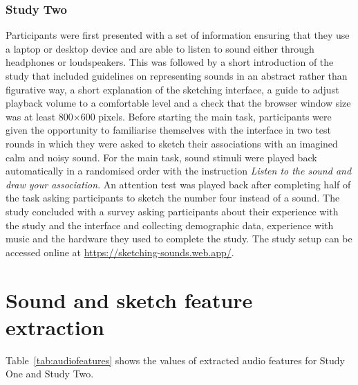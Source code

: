 \documentclass[]{interact}
\theoremstyle{plain}%
\theoremstyle{definition}
\theoremstyle{remark}
\begin{document}
\subsubsection{Study Two}\label{subsubsec:procedure_two}
Participants were first presented with a set of information ensuring that they use a laptop or desktop device and are able to listen to sound either through headphones or loudspeakers. This was followed by a short introduction of the study that included guidelines on representing sounds in an abstract rather than figurative way, a short explanation of the sketching interface, a guide to adjust playback volume to a comfortable level and a check that the browser window size was at least 800$\times$600 pixels. Before starting the main task, participants were given the opportunity to familiarise themselves with the interface in two test rounds in which they were asked to sketch their associations with an imagined calm and noisy sound. For the main task, sound stimuli were played back automatically in a randomised order with the instruction \textit{Listen to the sound and draw your association}. An attention test was played back after completing half of the task asking participants to sketch the number four instead of a sound. The study concluded with a survey asking participants  about their experience with the study and the interface and collecting demographic data, experience with music and the hardware they used to complete the study. The study setup can be accessed online at \url{https://sketching-sounds.web.app/}. 



\section{Sound and sketch feature extraction}\label{sec:extracted_features}

Table~\ref{tab:audiofeatures} shows the values of extracted audio features for Study One and Study Two.
\end{document}
